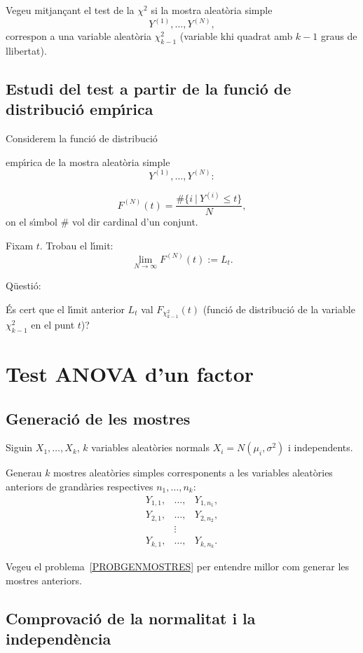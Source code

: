 Vegeu mitjan\c{c}ant el test de la $\chi^2$ si la mostra aleat\`oria
 simple
\[
Y^{(1)},\ldots,Y^{(N)},
\]
correspon a una variable aleat\`oria $\chi_{k-1}^2$ (variable khi 
quadrat amb $k-1$ graus de llibertat).

\subsection*{Estudi del test a partir de la funci\'o de 
distribuci\'o emp\'{\i}rica}

Considerem la funci\'o de distribuci\'o

emp\'{\i}rica de la mostra aleat\`oria
 simple 
\[
Y^{(1)},\ldots,Y^{(N)}:
\]
 
\[
F^{(N)} (t)= \frac{\#\{ i\ |\ Y^{(i)}\leq t\}}{N},
\]
on el s\'{\i}mbol $\#$ vol dir cardinal d'un conjunt. 

Fixam $t$. Trobau el l\'{\i}mit:
\[
\lim_{N\to\infty} F^{(N)} (t):= L_t.
\]

Q\"uesti\'o:

\'Es cert que el l\'{\i}mit anterior $L_t$ val $F_{\chi_{k-1}^2} (t)$ 
(funci\'o de distribuci\'o 
de la variable $\chi_{k-1}^2$ en el punt $t$)?

\section{Test ANOVA d'un factor}

\subsection{Generaci\'o de les mostres}

Siguin $X_1,\ldots,X_k$, $k$ variables aleat\`ories
 normals 
$X_i =N(\mu_i,\sigma^2)$ i independents.

Generau $k$ mostres aleat\`ories simples corresponents a les
variables aleat\`ories 
anteriors de grand\`aries respectives $n_1,\ldots,n_k$:
\[
\begin{array}{lcl}
Y_{1,1},&\ldots,&Y_{1,n_1},\\
Y_{2,1},&\ldots,&Y_{2,n_2},\\
&\vdots&\\
Y_{k,1},&\ldots,&Y_{k,n_k}.
\end{array}
\]

Vegeu el problema~\ref{PROBGENMOSTRES} per entendre millor com generar les 
mostres an\-te\-riors.

\subsection{Comprovaci\'o de la normalitat i la 
independ\`encia}

